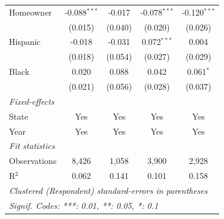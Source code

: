 \begin{tabular}{lcccc}
   Homeowner                      & -0.088$^{***}$             & -0.017                & -0.078$^{***}$                  & -0.120$^{***}$\\   
                                  & (0.015)                    & (0.040)               & (0.020)                         & (0.026)\\   
   Hispanic                       & -0.018                     & -0.031                & 0.072$^{***}$                   & 0.004\\   
                                  & (0.018)                    & (0.054)               & (0.027)                         & (0.029)\\   
   Black                          & 0.020                      & 0.088                 & 0.042                           & 0.061$^{*}$\\   
                                  & (0.021)                    & (0.056)               & (0.028)                         & (0.037)\\   
   \midrule
   \emph{Fixed-effects}\\
   State                          & Yes                        & Yes                   & Yes                             & Yes\\  
   Year                           & Yes                        & Yes                   & Yes                             & Yes\\  
   \midrule
   \emph{Fit statistics}\\
   Observations                   & 8,426                      & 1,058                 & 3,900                           & 2,928\\  
   R$^2$                          & 0.062                      & 0.141                 & 0.101                           & 0.158\\  
   \midrule \midrule
   \multicolumn{5}{l}{\emph{Clustered (Respondent) standard-errors in parentheses}}\\
   \multicolumn{5}{l}{\emph{Signif. Codes: ***: 0.01, **: 0.05, *: 0.1}}\\
\end{tabular}
\par\endgroup


